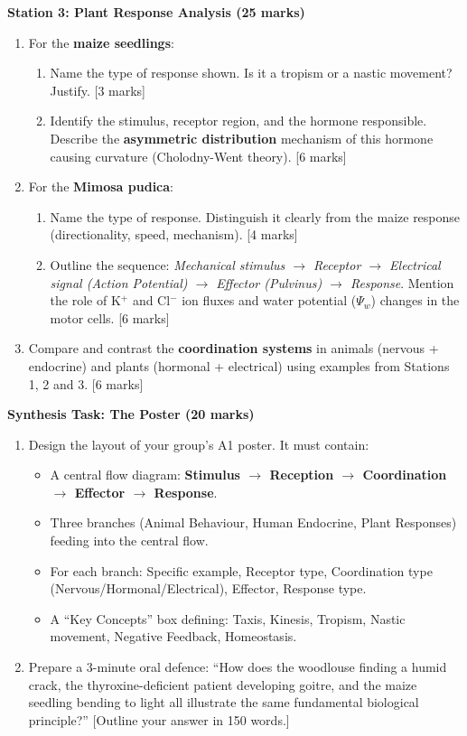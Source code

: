 \documentclass[11pt]{article}
\begin{document}
\textbf{Station 3: Plant Response Analysis (25 marks)}
\begin{enumerate}
    \item For the \textbf{maize seedlings}:
    \begin{enumerate}
        \item Name the type of response shown. Is it a tropism or a nastic movement? Justify. [3 marks]
        \item Identify the stimulus, receptor region, and the hormone responsible. Describe the \textbf{asymmetric distribution} mechanism of this hormone causing curvature (Cholodny-Went theory). [6 marks]
    \end{enumerate}
    \item For the \textbf{Mimosa pudica}:
    \begin{enumerate}
        \item Name the type of response. Distinguish it clearly from the maize response (directionality, speed, mechanism). [4 marks]
        \item Outline the sequence: \emph{Mechanical stimulus $\rightarrow$ Receptor $\rightarrow$ Electrical signal (Action Potential) $\rightarrow$ Effector (Pulvinus) $\rightarrow$ Response}. Mention the role of K$^+$ and Cl$^-$ ion fluxes and water potential ($\Psi_w$) changes in the motor cells. [6 marks]
    \end{enumerate}
    \item Compare and contrast the \textbf{coordination systems} in animals (nervous + endocrine) and plants (hormonal + electrical) using examples from Stations 1, 2 and 3. [6 marks]
\end{enumerate}

\textbf{Synthesis Task: The Poster (20 marks)}
\begin{enumerate}
    \item Design the layout of your group's A1 poster. It must contain:
    \begin{itemize}
        \item A central flow diagram: \textbf{Stimulus $\rightarrow$ Reception $\rightarrow$ Coordination $\rightarrow$ Effector $\rightarrow$ Response}.
        \item Three branches (Animal Behaviour, Human Endocrine, Plant Responses) feeding into the central flow.
        \item For each branch: Specific example, Receptor type, Coordination type (Nervous/Hormonal/Electrical), Effector, Response type.
        \item A ``Key Concepts'' box defining: Taxis, Kinesis, Tropism, Nastic movement, Negative Feedback, Homeostasis.
    \end{itemize}
    \item Prepare a 3-minute oral defence: ``How does the woodlouse finding a humid crack, the thyroxine-deficient patient developing goitre, and the maize seedling bending to light all illustrate the same fundamental biological principle?'' [Outline your answer in 150 words.]
\end{enumerate}
\end{document}
